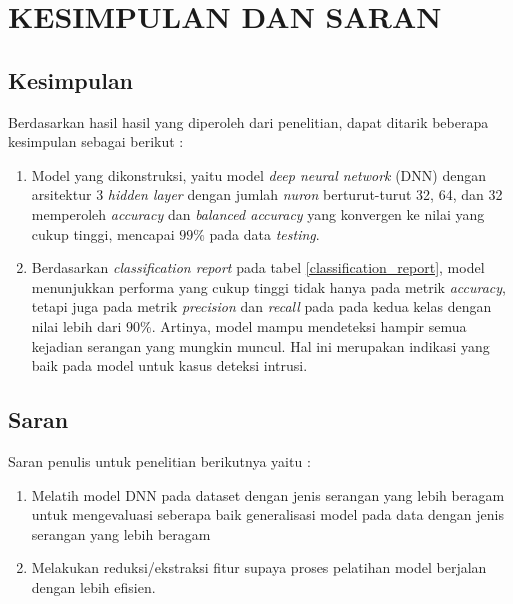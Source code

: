 \documentclass[a4paper,12pt]{report}
\begin{document}
\chapter{KESIMPULAN DAN SARAN}

\section{Kesimpulan}
Berdasarkan hasil hasil yang diperoleh dari penelitian, dapat ditarik beberapa kesimpulan sebagai berikut :
\begin{enumerate}
	\item Model yang dikonstruksi, yaitu model \textit{deep neural network} (DNN) dengan arsitektur 3 \textit{hidden layer} dengan jumlah \textit{nuron} berturut-turut 32, 64, dan 32 memperoleh \textit{accuracy} dan \textit{balanced accuracy} yang konvergen ke nilai yang cukup tinggi, mencapai $99\%$ pada data \textit{testing}.
	 
	\item Berdasarkan \textit{classification report} pada tabel \ref{classification_report}, model menunjukkan performa yang cukup tinggi tidak hanya pada metrik \textit{accuracy}, tetapi juga pada metrik \textit{precision} dan \textit{recall} pada pada kedua kelas dengan nilai lebih dari $90\%$. Artinya, model mampu mendeteksi hampir semua kejadian serangan yang mungkin muncul. Hal ini merupakan indikasi yang baik pada model untuk kasus deteksi intrusi.
\end{enumerate}

\section{Saran}
Saran penulis untuk penelitian berikutnya yaitu :
\begin{enumerate}
	\item Melatih model DNN pada dataset dengan jenis serangan yang lebih beragam untuk mengevaluasi seberapa baik generalisasi model pada data dengan jenis serangan yang lebih beragam
	
	\item Melakukan reduksi/ekstraksi fitur supaya proses pelatihan model berjalan dengan lebih efisien.
\end{enumerate}


\newpage
{}


\end{document}
